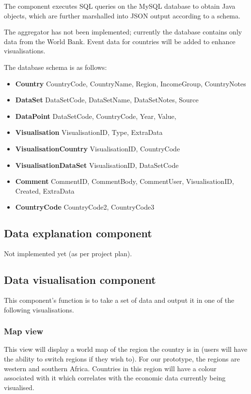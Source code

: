\documentclass[12pt,a4paper,twoside]{article}
\begin{document}
The component executes SQL queries on the MySQL database to obtain Java objects, which are further marshalled into JSON output according to a schema.

The aggregator has not been implemented; currently the database contains only data from the World Bank. Event data for countries will be added to enhance visualisations.

The database schema is as follows:

\begin{itemize}
	\item \textbf{Country} CountryCode, CountryName, Region, IncomeGroup, CountryNotes
	\item \textbf{DataSet} DataSetCode, DataSetName, DataSetNotes, Source
	\item \textbf{DataPoint} DataSetCode, CountryCode, Year, Value,
	\item \textbf{Visualisation} VisualisationID, Type, ExtraData
	\item \textbf{VisualisationCountry} VisualisationID, CountryCode
	\item \textbf{VisualisationDataSet} VisualisationID, DataSetCode
	\item \textbf{Comment} CommentID, CommentBody, CommentUser, VisualisationID, Created, ExtraData
	\item \textbf{CountryCode} CountryCode2, CountryCode3
\end{itemize}

\subsection{Data explanation component}
Not implemented yet (as per project plan).

\subsection{Data visualisation component}
This component's function is to take a set of data and output it in one of the following visualisations.
 
\subsubsection{Map view}
This view will display a world map of the region the country is in (users will have the ability to switch regions if they wish to). For our prototype, the regions are western and southern Africa. Countries in this region will have a colour associated with it which correlates with the economic data currently being visualised.
\end{document}
